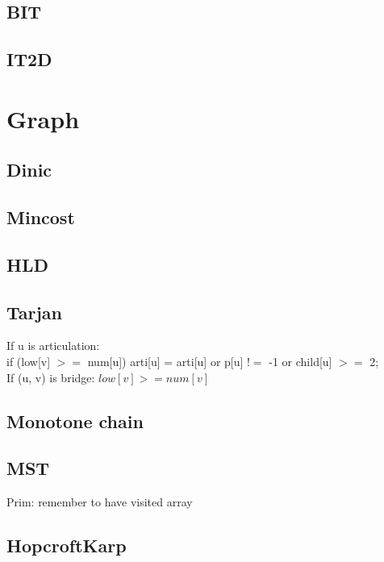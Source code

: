 \documentclass[A4 paper, 12pt, oneside, landscape]{article}
\begin{document}
\begin{multicols}{2}
	\subsection{BIT}
	
	
	\subsection{IT2D}
	

\section{Graph}
	\subsection{Dinic}
	

	\subsection{Mincost}
	
	
	\subsection{HLD}
	
	
	\subsection{Tarjan}
If u is articulation: \\
if (low[v] $>=$ num[u]) arti[u] = arti[u] or p[u] $!=$ -1 or child[u] $>=$ 2; \\
If (u, v) is bridge: $low[v] >= num[v]$
	\subsection{Monotone chain}
	

	\subsection{MST}
	Prim: remember to have visited array
	
	\subsection{HopcroftKarp}
	
	

\end{multicols}
\end{document}
